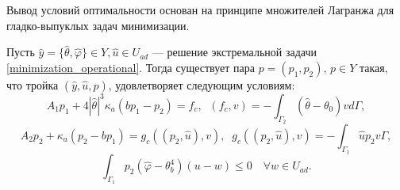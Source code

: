 Вывод условий оптимальности основан на принципе множителей Лагранжа для гладко-выпуклых задач минимизации.
\begin{thm}
    \label{adjoint_theorem}
    Пусть $\hat{y}=\{\hat{\theta},\hat{\varphi} \} \in Y, \hat{u} \in U_{ad}$ --- решение экстремальной задачи \eqref{minimization_operational}. Тогда существует пара $p = (p_1, p_2)$, $p \in Y$
    такая, что тройка $(\hat{y}, \hat{u}, p)$, удовлетворяет следующим условиям:
    \begin{equation}
        \label{therorem_2_eq1}
        A_1 p_1 + 4 |\hat{\theta}|^3 \kappa_a(b p_1 - p_2) = f_c, \;\; (f_c,v) = - \int_{\Gamma_2} (\hat{\theta} - \theta_0) v d\Gamma,
    \end{equation}
    \begin{equation}
        \label{therorem_2_eq2}
        A_2 p_2 + \kappa_a (p_2-b p_1) = g_c(( p_2, \hat{u}),v), \;\; g_c(( p_2, \hat{u}),v) = -\int_{\Gamma_1} \hat{u} p_2 v\Gamma,
    \end{equation}
    \begin{equation}
        \label{therorem_2_eq3}
        \int_{\Gamma_1} p_2 (\hat{\varphi} - \theta_b^4)(u-w) \leq 0 \quad \forall w \in U_{ad}.
    \end{equation}
\end{thm}
